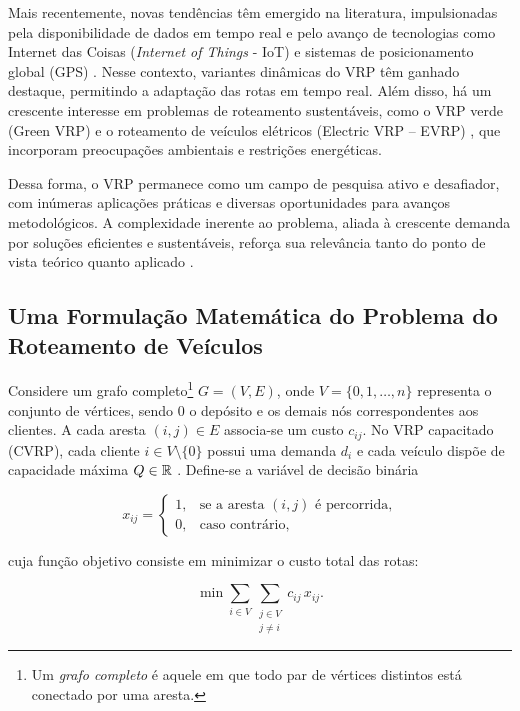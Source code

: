 Mais recentemente, novas tendências têm emergido na literatura, impulsionadas pela disponibilidade de dados em tempo real e pelo avanço de tecnologias como Internet das Coisas (\textit{Internet of Things} - IoT) e sistemas de posicionamento global (GPS) \cite{ritzinger2016survey, boysen2018scheduling}. Nesse contexto, variantes dinâmicas do VRP têm ganhado destaque, permitindo a adaptação das rotas em tempo real. Além disso, há um crescente interesse em problemas de roteamento sustentáveis, como o VRP verde (Green VRP) \cite{lin2014survey} e o roteamento de veículos elétricos (Electric VRP – EVRP) \cite{schiffer2017electric}, que incorporam preocupações ambientais e restrições energéticas.

Dessa forma, o VRP permanece como um campo de pesquisa ativo e desafiador, com inúmeras aplicações práticas e diversas oportunidades para avanços metodológicos. A complexidade inerente ao problema, aliada à crescente demanda por soluções eficientes e sustentáveis, reforça sua relevância tanto do ponto de vista teórico quanto aplicado \cite{braekers2016vehicle, moghdani2021green}.

\subsection{Uma Formulação Matemática do Problema do Roteamento de Veículos}


Considere um grafo completo\footnote{Um \textit{grafo completo} é aquele em que todo par de vértices distintos está conectado por uma aresta.} $G = (V, E)$, onde $V = \{0, 1, \dots, n\}$ representa o conjunto de vértices, sendo $0$ o depósito e os demais nós correspondentes aos clientes. A cada aresta $(i,j) \in E$ associa-se um custo $c_{ij}$. No VRP capacitado (CVRP), cada cliente $i \in V \setminus \{0\}$ possui uma demanda $d_i$ e cada veículo dispõe de capacidade máxima $Q\in\operatorname{\mathbb{R}}$ \cite{huang_solving_nodate}. Define-se a variável de decisão binária

\begin{equation}
    x_{ij} =
    \begin{cases}
        1, & \text{se a aresta } (i,j) \text{ é percorrida,} \\
        0, & \text{caso contrário,}
    \end{cases}
\end{equation}

\noindent cuja função objetivo consiste em minimizar o custo total das rotas:

\begin{equation}
    \min \sum_{i \in V} \sum_{\substack{j \in V \\ j \neq i}} c_{ij}\, x_{ij}.
\end{equation}

